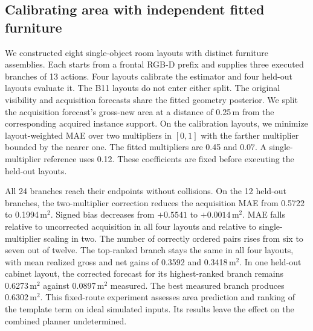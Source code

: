 \subsection{Calibrating area with independent fitted furniture}
We constructed eight single-object room layouts with distinct furniture assemblies. Each starts from a frontal RGB-D prefix and supplies three executed branches of 13 actions. Four layouts calibrate the estimator and four held-out layouts evaluate it. The B11 layouts do not enter either split. The original visibility and acquisition forecasts share the fitted geometry posterior. We split the acquisition forecast's gross-new area at a distance of 0.25\,m from the corresponding acquired instance support. On the calibration layouts, we minimize layout-weighted MAE over two multipliers in $[0,1]$ with the farther multiplier bounded by the nearer one. The fitted multipliers are 0.45 and 0.07. A single-multiplier reference uses 0.12. These coefficients are fixed before executing the held-out layouts.

All 24 branches reach their endpoints without collisions. On the 12 held-out branches, the two-multiplier correction reduces the acquisition MAE from 0.5722 to 0.1994\,m$^2$. Signed bias decreases from $+0.5541$ to $+0.0014$\,m$^2$. MAE falls relative to uncorrected acquisition in all four layouts and relative to single-multiplier scaling in two. The number of correctly ordered pairs rises from six to seven out of twelve. The top-ranked branch stays the same in all four layouts, with mean realized gross and net gains of 0.3592 and 0.3418\,m$^2$. In one held-out cabinet layout, the corrected forecast for its highest-ranked branch remains 0.6273\,m$^2$ against 0.0897\,m$^2$ measured. The best measured branch produces 0.6302\,m$^2$. This fixed-route experiment assesses area prediction and ranking of the template term on ideal simulated inputs. Its results leave the effect on the combined planner undetermined.


